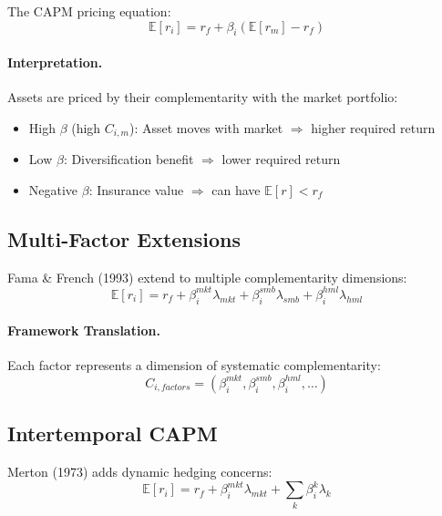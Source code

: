 The CAPM pricing equation:
\begin{equation}
\mathbb{E}[r_i] = r_f + \beta_i (\mathbb{E}[r_m] - r_f)
\end{equation}

\paragraph{Interpretation.}
Assets are priced by their complementarity with the market portfolio:
\begin{itemize}
    \item High $\beta$ (high $C_{i,m}$): Asset moves with market $\Rightarrow$ higher required return
    \item Low $\beta$: Diversification benefit $\Rightarrow$ lower required return
    \item Negative $\beta$: Insurance value $\Rightarrow$ can have $\mathbb{E}[r] < r_f$
\end{itemize}

\subsection{Multi-Factor Extensions}

Fama \& French (1993) extend to multiple complementarity dimensions:
\begin{equation}
\mathbb{E}[r_i] = r_f + \beta_i^{mkt} \lambda_{mkt} + \beta_i^{smb} \lambda_{smb} + \beta_i^{hml} \lambda_{hml}
\end{equation}

\paragraph{Framework Translation.}
Each factor represents a dimension of systematic complementarity:
\begin{equation}
C_{i,factors} = (\beta_i^{mkt}, \beta_i^{smb}, \beta_i^{hml}, \ldots)
\end{equation}

\subsection{Intertemporal CAPM}

Merton (1973) adds dynamic hedging concerns:
\begin{equation}
\mathbb{E}[r_i] = r_f + \beta_i^{mkt} \lambda_{mkt} + \sum_k \beta_i^{k} \lambda_k
\end{equation}

